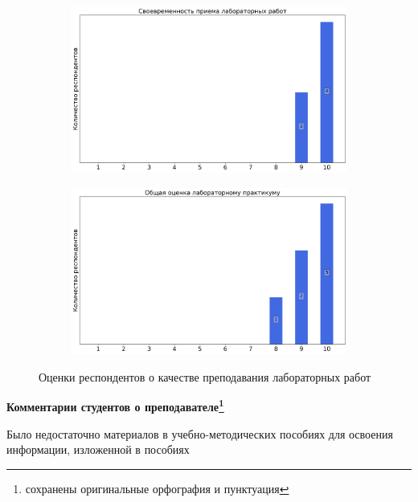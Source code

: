 \begin{figure}[H]
\begin{subfigure}[b]{0.45\textwidth}
                \includegraphics[width=\textwidth]{images/2 course/Радиотехнические цепи и сигналы/labniks-marks-Храмов Е.С.-2.png}
            \end{subfigure}
            \begin{subfigure}[b]{0.45\textwidth}
                \centering
                \includegraphics[width=\textwidth]{images/2 course/Радиотехнические цепи и сигналы/labniks-marks-Храмов Е.С.-3.png}
            \end{subfigure}	
            \caption{Оценки респондентов о качестве преподавания лабораторных работ}
        \end{figure}

        \textbf{Комментарии студентов о преподавателе\protect\footnote{сохранены оригинальные орфография и пунктуация}}
            \begin{commentbox} 
                Было недостаточно материалов в учебно-методических пособиях для освоения информации, изложенной в пособиях   
            \end{commentbox} 
        
